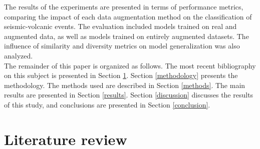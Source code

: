 \documentclass[journal]{IEEEtran}
\begin{document}
The results of the experiments are presented in terms of performance metrics, comparing the impact of each data augmentation method on the classification of seismic-volcanic events. The evaluation included models trained on real and augmented data, as well as models trained on entirely augmented datasets. The influence of similarity and diversity metrics on model generalization was also analyzed.\\
The remainder of this paper is organized as follows. The most recent bibliography on this subject is presented in Section \ref{literaturereview}. Section \ref{methodology} presents the methodology. The methods used are described in Section \ref{methods}. The main results are presented in Section \ref{results}. Section \ref{discussion} discusses the results of this study, and conclusions are presented in Section \ref{conclusion}.

\section{Literature review} \label{literaturereview}
\end{document}

